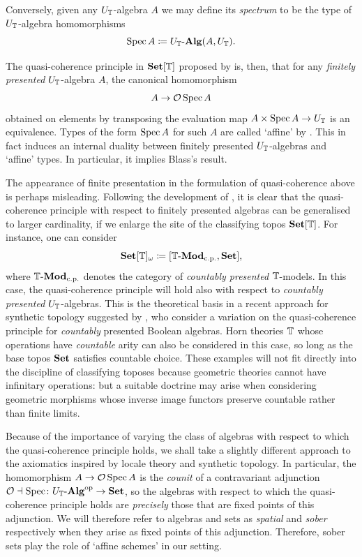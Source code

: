 Conversely, given any $U_{\mathbb{T}}$-algebra $A$ we may define its \emph{spectrum} to be the type of $U_{\mathbb{T}}$-algebra homomorphisms 
\[ \spec A \coloneq U_\T\alg(A,U_\T)\text{.}\]

The quasi-coherence principle in $\mathbf{Set}[\mathbb{T}]$ proposed by \citet{blechschmidt2021using} is, then, that for any \emph{finitely presented} $U_{\mathbb{T}}$-algebra $A$, the canonical homomorphism
\[
  A\to \mathcal{O}\operatorname{Spec} A
\]
obtained on elements by transposing the evaluation map $A\times \operatorname{Spec} A\to U_{\mathbb{T}}$ is an equivalence.
Types of the form $\operatorname{Spec} A$ for such $A$ are called `affine' by \citet{blechschmidt2021using}. This in fact induces an internal duality between finitely presented $U_{\mathbb{T}}$-algebras and `affine' types. In particular, it implies Blass's result. 

The appearance of finite presentation in the formulation of quasi-coherence above is perhaps misleading. Following the development of \citet{blechschmidt2021using,blechschmidt2020general}, it is clear that the quasi-coherence principle with respect to finitely presented algebras can be generalised to larger cardinality,
if we enlarge the site of the classifying topos $\mathbf{Set}[\mathbb{T}]$. For instance, one can consider
\[ \Set[\T]_\omega \coloneq [\mmod\T\cp,\Set]\text{,} \]
where $\mmod\T\cp$ denotes the category of \emph{countably presented} $\mathbb{T}$-models. In this case, the quasi-coherence principle will hold also with respect to \emph{countably presented} $U_{\mathbb{T}}$-algebras. This is the theoretical basis in a recent approach for synthetic topology suggested by \citet{cherubini2024foundation}, who consider a variation on the quasi-coherence principle for \emph{countably} presented Boolean algebras. 
%
Horn theories $\mathbb{T}$ whose operations have \emph{countable} arity can also be considered in this case, so long as the base topos $\mathbf{Set}$ satisfies countable choice. These examples will not fit directly into the discipline of classifying toposes because geometric theories cannot have infinitary operations: but a suitable doctrine may arise when considering geometric morphisms whose inverse image functors preserve countable rather than finite limits.

Because of the importance of varying the class of algebras with respect to which the quasi-coherence principle holds, we shall take a slightly different approach to the axiomatics inspired by locale theory and synthetic topology. In particular, the homomorphism $A\to \mathcal{O}\operatorname{Spec} A$ is the \emph{counit} of a contravariant adjunction $\opens\dashv \spec\colon U_\T\alg\op\to \Set$, so the algebras with respect to which the quasi-coherence principle holds are \emph{precisely} those that are fixed points of this adjunction.  We will therefore refer to algebras and sets as \emph{spatial} and \emph{sober} respectively when they arise as fixed points of this adjunction. Therefore, sober sets play the role of `affine schemes' in our setting.

